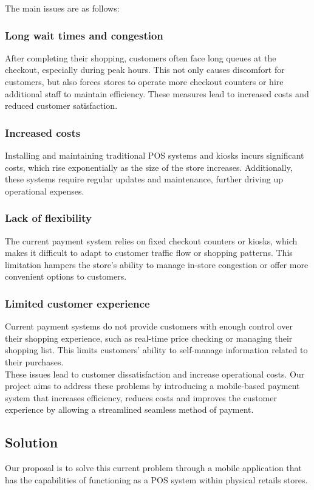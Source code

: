 \documentclass[conference]{IEEEtran}
\begin{document}
The main issues are as follows: \\
\subsubsection{Long wait times and congestion}

After completing their shopping, customers often face long queues at the checkout, especially during peak hours. This not only causes discomfort for customers, but also forces stores to operate more checkout counters or hire additional staff to maintain efficiency. These measures lead to increased costs and reduced customer satisfaction. 

\subsubsection{Increased costs}
Installing and maintaining traditional POS systems and kiosks incurs significant costs, which rise exponentially as the size of the store increases. Additionally, these systems require regular updates and maintenance, further driving up operational expenses.

\subsubsection{Lack of flexibility}
The current payment system relies on fixed checkout counters or kiosks, which makes it difficult to adapt to customer traffic flow or shopping patterns. This limitation hampers the store's ability to manage in-store congestion or offer more convenient options to customers.

\subsubsection{Limited customer experience}
Current payment systems do not provide customers with enough control over their shopping experience, such as real-time price checking or managing their shopping list. This limits customers' ability to self-manage information related to their purchases. \\

These issues lead to customer dissatisfaction and increase operational costs. Our project aims to address these problems by introducing a mobile-based payment system that increases efficiency, reduces costs and improves the customer experience by allowing a streamlined seamless method of payment. 

\subsection{Solution}
Our proposal is to solve this current problem through a mobile application that has the capabilities of functioning as a POS system within physical retails stores. 
\end{document}

